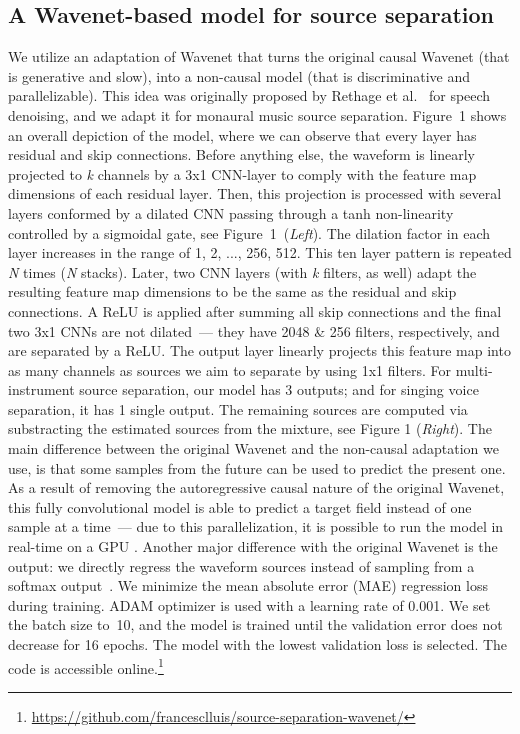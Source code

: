 \documentclass[a4paper]{article}
\begin{document}
\vspace{-2mm}
\subsection{A Wavenet-based model for source separation}


We utilize an adaptation of Wavenet \cite{van2016wavenet} that turns the original causal Wavenet (that is generative and slow), into a non-causal model (that is discriminative and parallelizable). This idea was originally proposed by Rethage et al.~\cite{rethage2017wavenet} for speech denoising, and we adapt it for monaural music source separation. Figure~1 shows an overall depiction of the model, where we can observe that every layer has residual and skip connections.
Before anything else, the waveform is linearly projected to \textit{k} channels by a 3x1 CNN-layer to comply with the feature map dimensions of each residual layer. Then, this projection is processed with several layers conformed by a dilated CNN passing through a tanh non-linearity controlled by a sigmoidal gate, see Figure~1~(\textit{Left}). The dilation factor in each layer increases in the range of 1, 2, ..., 256, 512. This ten layer pattern is repeated \textit{N} times (\textit{N} stacks).  
Later, two CNN layers (with \textit{k} filters, as well) adapt the resulting feature map dimensions to be the same as the residual and skip connections. A ReLU is applied after summing all skip connections and the final two 3x1 CNNs are not dilated~--- they have 2048 \& 256 filters, respectively, and are separated by a ReLU. The output layer linearly projects this feature map into as many channels as sources we aim to separate by using 1x1 filters. For multi-instrument source separation, our model has 3 outputs; and for singing voice separation, it has 1 single output. The remaining sources are computed via substracting the estimated sources from the mixture, see Figure 1 (\textit{Right}).
The main difference between the original Wavenet and the non-causal adaptation we use, is that some samples from the future can be used to predict the present one. 
As a result of removing the autoregressive causal nature of the original Wavenet, this fully convolutional model is able to predict a target field instead of one sample at a time~--- due to this parallelization, it is possible to run the model in real-time on a GPU \cite{rethage2017wavenet}.  
Another major difference with the original Wavenet is the output: we directly regress the waveform sources instead of sampling from a softmax output~\cite{rethage2017wavenet}. 
We minimize the mean absolute error (MAE) regression loss during training. ADAM optimizer is used with a learning rate of 0.001. We set the batch size to~10, and the model is trained until the validation error does not decrease for 16 epochs. The model with the lowest validation loss is selected. The code is accessible online.\footnote{\href{http://github.com/francesclluis/source-separation-wavenet}{https://github.com/francesclluis/source-separation-wavenet/}} 
\end{document}
